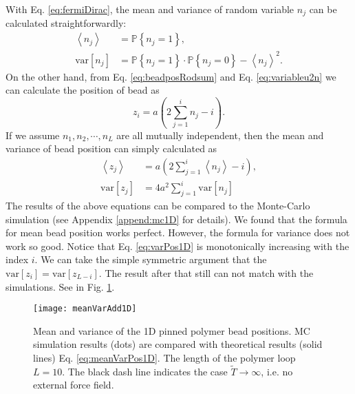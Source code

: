 With Eq. \eqref{eq:fermiDirac}, the mean and variance of random variable $n_j$ can be calculated straightforwardly:
\begin{subequations}
    \begin{align}
        \label{eq:nmean}
        \left<n_j\right> & = \mathbb{P}\left\{n_j=1\right\},\\
        \label{eq:nvar}
        \text{var}\left[n_j\right] & = \mathbb{P}\left\{n_j=1\right\} \cdot \mathbb{P}\left\{ n_j=0\right\} 
        - \left<n_j\right>^2.
    \end{align}
\end{subequations}
On the other hand, from Eq. \eqref{eq:beadposRodsum} and Eq. \eqref{eq:variableu2n} we can calculate the position of bead as
\begin{equation}
    \label{eq:beadpos1D}
    z_i = a\left(2\sum_{j=1}^i n_j - i\right).
\end{equation}
If we assume $n_1, n_2, \cdots, n_L$ are all mutually independent, then the mean and variance of bead position can simply calculated as
\begin{subequations}
    \label{eq:meanVarPos1D}
    \begin{align}
    \label{eq:meanPos1D}
        \left<z_j\right> & = a \left(2\sum_{j=1}^i \left<n_j\right> - i\right),\\
    \label{eq:varPos1D}
        \text{var}\left[z_j\right] & = 4a^2\sum_{j=1}^i\text{var}\left[n_j\right]
    \end{align}
\end{subequations}
The results of the above equations can be compared to the Monte-Carlo simulation (see Appendix \ref{append:mc1D} for details). 
We found that the formula for mean bead position works perfect. However, the formula for variance does not work so good. Notice that Eq. \eqref{eq:varPos1D} is monotonically increasing with the index $i$. We can take the simple symmetric argument that the $\text{var}\left[z_i\right] = \text{var}\left[z_{L-i}\right]$. The result after that still can not match with the simulations. See in Fig. \ref{fig:meanVarAdd1D}.

\begin{figure}[htpb]
    \centering
    \texttt{[image: meanVarAdd1D]}
    \caption{Mean and variance of the 1D pinned polymer bead positions. MC simulation results (dots) are compared with theoretical results (solid lines) Eq. \ref{eq:meanVarPos1D}. The length of the polymer loop $L=10$. The black dash line indicates the case $\tilde{T}\rightarrow\infty$, i.e. no external force field. }
    \label{fig:meanVarAdd1D}
\end{figure}

